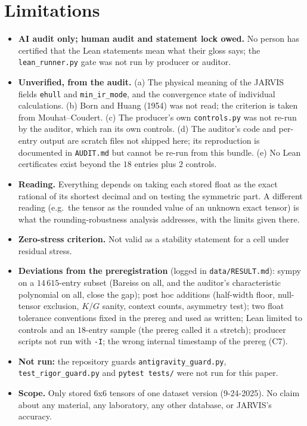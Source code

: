 \documentclass[10pt]{article}
\begin{document}
\section{Limitations}\label{sec:lim}
\begin{itemize}\itemsep=1pt
\item \textbf{AI audit only; human audit and statement lock owed.} No person has certified that the Lean statements mean what their gloss says; the \texttt{lean\_runner.py} gate was not run by producer or auditor.
\item \textbf{Unverified, from the audit.} (a) The physical meaning of the JARVIS fields \texttt{ehull} and \texttt{min\_ir\_mode}, and the convergence state of individual calculations. (b) Born and Huang (1954) was not read; the criterion is taken from Mouhat--Coudert. (c) The producer's own \texttt{controls.py} was not re-run by the auditor, which ran its own controls. (d) The auditor's code and per-entry output are scratch files not shipped here; its reproduction is documented in \texttt{AUDIT.md} but cannot be re-run from this bundle. (e) No Lean certificates exist beyond the $18$ entries plus $2$ controls.
\item \textbf{Reading.} Everything depends on taking each stored float as the exact rational of its shortest decimal and on testing the symmetric part. A different reading (e.g.\ the tensor as the rounded value of an unknown exact tensor) is what the rounding-robustness analysis addresses, with the limits given there.
\item \textbf{Zero-stress criterion.} Not valid as a stability statement for a cell under residual stress.
\item \textbf{Deviations from the preregistration} (logged in \texttt{data/RESULT.md}): sympy on a $14\,615$-entry subset (Bareiss on all, and the auditor's characteristic polynomial on all, close the gap); post hoc additions (half-width floor, null-tensor exclusion, $K$/$G$ sanity, context counts, asymmetry test); two float tolerance conventions fixed in the prereg and used as written; Lean limited to controls and an $18$-entry sample (the prereg called it a stretch); producer scripts not run with \texttt{-I}; the wrong internal timestamp of the prereg (C7).
\item \textbf{Not run:} the repository guards \texttt{antigravity\_guard.py}, \texttt{test\_rigor\_guard.py} and \texttt{pytest tests/} were not run for this paper.
\item \textbf{Scope.} Only stored 6x6 tensors of one dataset version (9-24-2025). No claim about any material, any laboratory, any other database, or JARVIS's accuracy.
\end{itemize}
\end{document}
